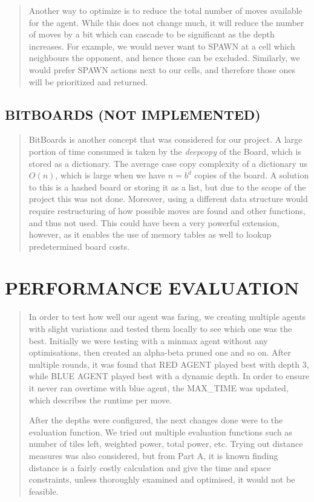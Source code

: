 \documentclass[
]{article}
\begin{document}
\begin{quote}
Another way to optimize is to reduce the total number of moves available
for the agent. While this does not change much, it will reduce the
number of moves by a bit which can cascade to be significant as the
depth increases. For example, we would never want to SPAWN at a cell
which neighbours the opponent, and hence those can be excluded.
Similarly, we would prefer SPAWN actions next to our cells, and
therefore those ones will be prioritized and returned.
\end{quote}

\hypertarget{bitboards-not-implemented}{%
\subsection{BITBOARDS (NOT
IMPLEMENTED)}\label{bitboards-not-implemented}}

\begin{quote}
BitBoards is another concept that was considered for our project. A
large portion of time consumed is taken by the \emph{deepcopy} of the
Board, which is stored as a dictionary. The average case copy complexity
of a dictionary us \(O(n)\), which is large when we have \(n = b^{d}\)
copies of the board. A solution to this is a hashed board or storing it
as a list, but due to the scope of the project this was not done.
Moreover, using a different data structure would require restructuring
of how possible moves are found and other functions, and thus not used.
This could have been a very powerful extension, however, as it enables
the use of memory tables as well to lookup predetermined board costs.
\end{quote}

\hypertarget{performance-evaluation}{%
\section{PERFORMANCE EVALUATION}\label{performance-evaluation}}

\begin{quote}
In order to test how well our agent was faring, we creating multiple
agents with slight variations and tested them locally to see which one
was the best. Initially we were testing with a minmax agent without any
optimisations, then created an alpha-beta pruned one and so on. After
multiple rounds, it was found that RED AGENT played best with depth 3,
while BLUE AGENT played best with a dynamic depth. In order to ensure it
never ran overtime with blue agent, the MAX\_TIME was updated, which
describes the runtime per move.

After the depths were configured, the next changes done were to the
evaluation function. We tried out multiple evaluation functions such as
number of tiles left, weighted power, total power, etc. Trying out
distance measures was also considered, but from Part A, it is known
finding distance is a fairly costly calculation and give the time and
space constraints, unless thoroughly examined and optimised, it would
not be feasible.
\end{quote}
\end{document}
